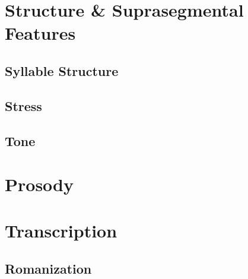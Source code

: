 \documentclass[a4paper,11pt,oneside,openany]{memoir}
\newcommand{\parentlang}{Enłalen}
\begin{document}
\section{Structure \& Suprasegmental Features}

\subsection{Syllable Structure}

\subsection{Stress}


\subsection{Tone}

\section{Prosody}

\section{Transcription}

\subsection{Romanization}
\end{document}
